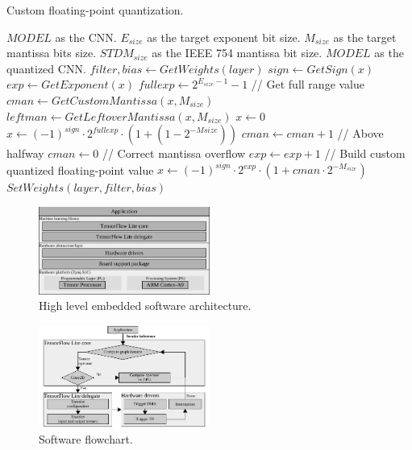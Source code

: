 \begin{algorithm}[h!]
	\caption{Custom floating-point quantization.}
	\label{alg:quantize_training}
	\begin{algorithmic}
		\SetAlgoLined
		\renewcommand{\algorithmicrequire}{\textbf{input:}}
		\renewcommand{\algorithmicensure}{\textbf{output:}}
		\REQUIRE $MODEL$ as the CNN.
		\REQUIRE $E_{size}$ as the target exponent bit size.
		\REQUIRE $M_{size}$ as the target mantissa bits size.
		\REQUIRE $STDM_{size}$ as the IEEE 754 mantissa bit size.
		\ENSURE $MODEL$ as the quantized CNN.
		\STATE $filter, bias \gets GetWeights(layer)$
			\STATE $sign \gets GetSign(x)$
			\STATE $exp \gets GetExponent(x)$
			\STATE $fullexp \gets 2^{E_{size}-1}-1$ // Get full range value
			\STATE $cman \gets GetCustomMantissa(x, M_{size})$
			\STATE $leftman \gets GetLeftoverMantissa(x, M_{size})$
				\STATE$x\gets0$
				\STATE$x\gets (-1)^{sign}\cdot2^{fullexp}\cdot(1+(1-2^{-M{size}}))$
			\ELSE
					\STATE $cman \gets cman+1$ // Above halfway
					\STATE $cman \gets 0$ // Correct mantissa overflow
					\STATE $exp \gets exp + 1$
					\ENDIF
				\ENDIF
				\STATE // Build custom quantized floating-point value
				\STATE$x\gets (-1)^{sign}\cdot2^{exp}\cdot(1+cman\cdot2^{-M_{size}})$
			\ENDIF
		\ENDFOR
		\STATE $SetWeights(layer, filter, bias)$
		\ENDIF
		\ENDFOR
	\end{algorithmic}
\end{algorithm}
\begin{figure}[t!]
	\centering
	\includegraphics[width=0.5\textwidth]{./chapters/cnn_accelerator/figures/sw_stack.pdf}
	\caption{High level embedded software architecture.}
	\label{fig:sw_stack}
\end{figure}

\begin{figure}[t!]
	\centering
	\includegraphics[width=0.5\textwidth]{./chapters/cnn_accelerator/figures/sw_stack_flowchart.pdf}
	\caption{Software flowchart.}
	\label{fig:sw_stack_flowchart}
\end{figure}

